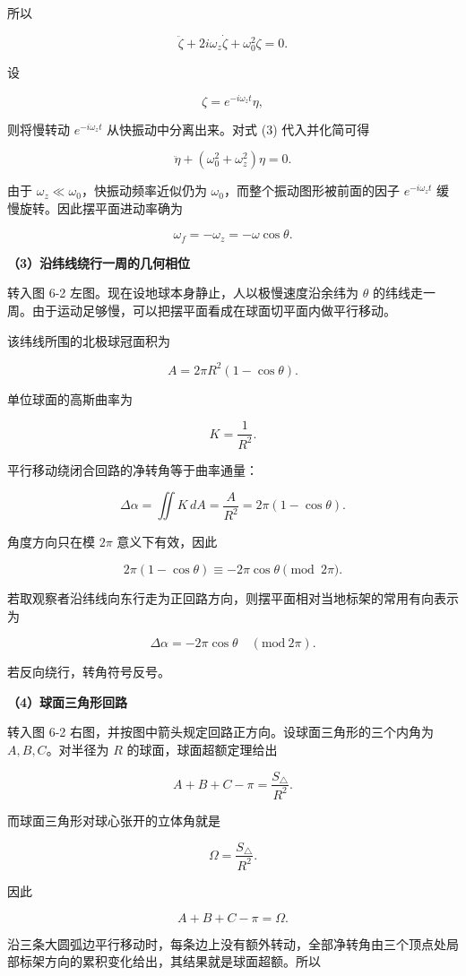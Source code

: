 \documentclass[12pt,a4paper,UTF8]{ctexart}
\begin{document}
所以

\[
\ddot\zeta+2i\omega_z\dot\zeta+\omega_0^2\zeta=0. \tag{3}
\]

设

\[
\zeta=e^{-i\omega_zt}\eta,
\]

则将慢转动 \(e^{-i\omega_zt}\) 从快振动中分离出来。对式 (3)
代入并化简可得

\[
\ddot\eta+(\omega_0^2+\omega_z^2)\eta=0.
\]

由于 \(\omega_z\ll\omega_0\)，快振动频率近似仍为
\(\omega_0\)，而整个振动图形被前面的因子 \(e^{-i\omega_zt}\)
缓慢旋转。因此摆平面进动率确为

\[
\omega_f=-\omega_z=-\omega\cos\theta.
\]

\textbf{（3）沿纬线绕行一周的几何相位}

转入图 6-2 左图。现在设地球本身静止，人以极慢速度沿余纬为 \(\theta\)
的纬线走一周。由于运动足够慢，可以把摆平面看成在球面切平面内做平行移动。

该纬线所围的北极球冠面积为

\[
A=2\pi R^2(1-\cos\theta).
\]

单位球面的高斯曲率为

\[
K=\frac1{R^2}.
\]

平行移动绕闭合回路的净转角等于曲率通量：

\[
\Delta\alpha
=\iint K\,dA
=\frac{A}{R^2}
=2\pi(1-\cos\theta).
\]

角度方向只在模 \(2\pi\) 意义下有效，因此

\[
2\pi(1-\cos\theta)
\equiv-2\pi\cos\theta\pmod{2\pi}.
\]

若取观察者沿纬线向东行走为正回路方向，则摆平面相对当地标架的常用有向表示为

\[
\boxed{\Delta\alpha=-2\pi\cos\theta\quad(\mathrm{mod}\ 2\pi)}.
\]

若反向绕行，转角符号反号。

\textbf{（4）球面三角形回路}

转入图 6-2 右图，并按图中箭头规定回路正方向。设球面三角形的三个内角为
\(A,B,C\)。对半径为 \(R\) 的球面，球面超额定理给出

\[
A+B+C-\pi=\frac{S_\triangle}{R^2}.
\]

而球面三角形对球心张开的立体角就是

\[
\Omega=\frac{S_\triangle}{R^2}.
\]

因此

\[
A+B+C-\pi=\Omega.
\]

沿三条大圆弧边平行移动时，每条边上没有额外转动，全部净转角由三个顶点处局部标架方向的累积变化给出，其结果就是球面超额。所以
\end{document}

